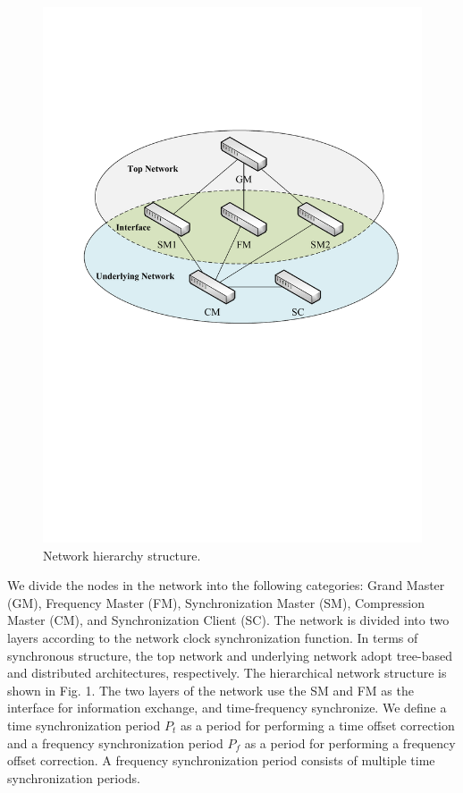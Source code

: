 \documentclass[conference]{IEEEtran}
\begin{document}
\begin{figure}[htbp]
	\centerline{\includegraphics[scale=0.45]{fig1.eps}}
	\caption{Network hierarchy structure.}
	\label{fig1}
\end{figure}

We divide the nodes in the network into the following categories: Grand Master (GM), Frequency Master (FM), Synchronization Master (SM), Compression Master (CM), and Synchronization Client (SC). The network is divided into two layers according to the network clock synchronization function. In terms of synchronous structure, the top network and underlying network adopt tree-based and distributed architectures, respectively. The hierarchical network structure is shown in Fig. 1. The two layers of the network use the SM and FM as the interface for information exchange, and time-frequency synchronize. We define a time synchronization period $P_t$ as a period for performing a time offset correction and a frequency synchronization period $P_f$ as a period for performing a frequency offset correction. A frequency synchronization period consists of multiple time synchronization periods.
\end{document}

